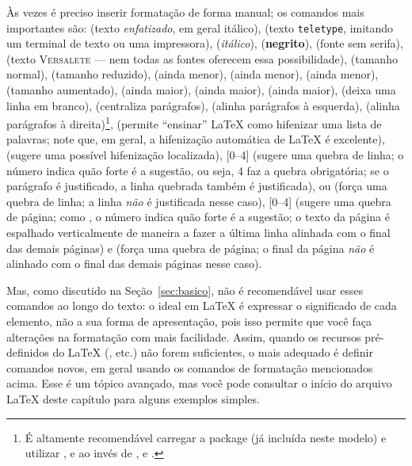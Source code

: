 Às vezes é preciso inserir formatação de forma manual; os comandos mais
importantes são:
 (texto \emph{enfatizado}, em geral itálico),
 (texto \texttt{teletype}, imitando um
terminal de texto ou uma impressora),
 (\textit{itálico}),
 (\textbf{negrito}),
 (fonte \textsf{sem serifa}),
 (texto \textsc{Versalete} --- nem todas
as fontes oferecem essa possibilidade),
 (tamanho normal),
 (tamanho reduzido),
 (ainda menor),
 (ainda menor),
 (ainda menor),
 (tamanho aumentado),
 (ainda maior),
 (ainda maior),
 (ainda maior),
 (deixa uma linha em branco),
 (centraliza parágrafos),
 (alinha parágrafos à esquerda),
 (alinha parágrafos à direita)\footnote{É
altamente recomendável carregar a package  (já incluída
neste modelo) e utilizar ,  e
 ao invés de , 
e .},
 (permite ``ensinar'' \LaTeX{} como hifenizar uma
lista de palavras; note que, em geral, a hifenização automática de \LaTeX{}
é excelente),
\ltxcmd{-} (sugere uma possível hifenização localizada),
[0--4] (sugere uma quebra de linha; o número indica
quão forte é a sugestão, ou seja, 4 faz a quebra obrigatória; se o
parágrafo é justificado, a linha quebrada também é justificada),
 ou \cmd{\sla\sla} (força uma quebra de linha; a
linha \emph{não} é justificada nesse caso),
[0--4] (sugere uma quebra de página; como
, o número indica quão forte é a sugestão; o texto
da página é espalhado verticalmente de maneira a fazer a última linha
alinhada com o final das demais páginas) e
 (força uma quebra de página; o final da página
\emph{não} é alinhado com o final das demais páginas nesse caso).

Mas, como discutido na Seção~\ref{sec:basico}, não é recomendável
usar esses comandos ao longo do texto: o ideal em \LaTeX{} é expressar
o significado de cada elemento, não a sua forma de apresentação,
pois isso permite que você faça alterações na formatação com mais
facilidade. Assim, quando os recursos pré-definidos do \LaTeX{}
(,  etc.) não forem suficientes,
o mais adequado é definir comandos novos, em geral usando os comandos
de formatação mencionados acima. Esse é um tópico avançado, mas você
pode consultar o início do arquivo \LaTeX{} deste capítulo para alguns
exemplos simples.

